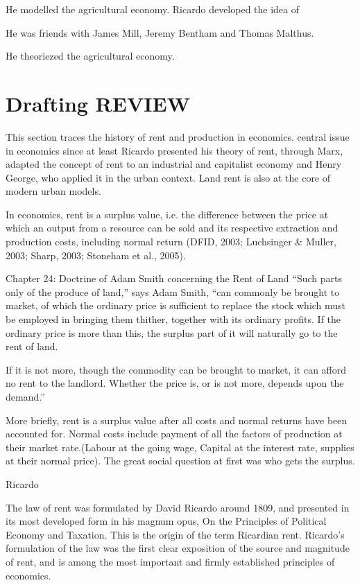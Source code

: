He modelled the agricultural economy.
Ricardo developed the idea of 

He was friends with James Mill, Jeremy Bentham and Thomas Malthus.

He theoriezed the agricultural economy.





\section{Drafting REVIEW}
This section traces the history of rent and production in economics.
 central issue in economics since at least Ricardo presented his theory of  rent, through Marx, adapted the concept of rent to an industrial and capitalist economy and Henry George, who applied it in the urban context. Land rent is also at the core of modern urban models.  


In economics, rent is a surplus value, i.e. the difference between the price at which an output from a resource can be sold and its respective extraction and production costs, including normal return (DFID, 2003; Luchsinger \& M\:uller, 2003; Sharp, 2003; Stoneham et al., 2005).

Chapter 24: Doctrine of Adam Smith concerning the Rent of Land
``Such parts only of the produce of land,” says Adam Smith, ``can commonly be brought to market, of which the ordinary price is sufficient to replace the stock which must be employed in bringing them thither, together with its ordinary profits. If the ordinary price is more than this, the surplus part of it will naturally go to the rent of land.

If it is not more, though the commodity can be brought to market, it can afford no rent to the landlord. Whether the price is, or is not more, depends upon the demand.''

More briefly, rent is a surplus value after all costs and normal returns have been accounted for. Normal costs include  payment of all the factors of production at their market rate.(Labour at the going wage, Capital at the interest rate, supplies at their normal price). The great social question at first was who gets the surplus.  


Ricardo

The law of rent was formulated by David Ricardo around 1809, and presented in its most developed form in his magnum opus, On the Principles of Political Economy and Taxation. This is the origin of the term Ricardian rent. Ricardo's formulation of the law was the first clear exposition of the source and magnitude of rent, and is among the most important and firmly established principles of economics.

